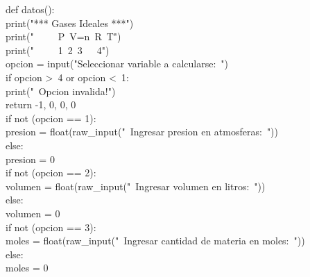 \documentclass[10pt,letterpaper]{article}
\newenvironment{Code}
{
\begin{lrbox}{\selvestebox}%
\begin{minipage}{\dimexpr\columnwidth-2\fboxsep\relax}
\fontfamily{\ttdefault}\selectfont
}
{\end{minipage}\end{lrbox}%
\begin{center}
\colorbox{light-gray}{\usebox{\selvestebox}}
\end{center}
}
\begin{document}
\begin{Code}
def datos():\\
\hspace*{8mm}print("*** Gases Ideales ***")\\
\hspace*{8mm}print("\ \ \ \ \ P\ V=n\ R\ T")\\
\hspace*{8mm}print("\ \ \ \ \ 1\ 2\ 3\ \ \ 4")\\
\hspace*{8mm}opcion = input("Seleccionar variable a calcularse:\ ")\\
\hspace*{8mm}if opcion >\ 4 or opcion <\ 1:\\
\hspace*{16mm}print("\ \hspace*{-2mm}Opcion invalida!")\\
\hspace*{16mm}return -1, 0, 0, 0\\
\hspace*{8mm}if not (opcion == 1):\\
\hspace*{16mm}presion = float(raw\_input("\ \hspace*{-2mm}Ingresar presion en atmosferas:\ "))\\
\hspace*{8mm}else:\\
\hspace*{16mm}presion = 0\\
\hspace*{8mm}if not (opcion == 2):\\
\hspace*{16mm}volumen = float(raw\_input("\ \hspace*{-2mm}Ingresar volumen en litros:\ "))\\
\hspace*{8mm}else:\\
\hspace*{16mm}volumen = 0\\
\hspace*{8mm}if not (opcion == 3):\\
\hspace*{16mm}moles = float(raw\_input("\ \hspace*{-2mm}Ingresar cantidad de materia en moles:\ "))\\
\hspace*{8mm}else:\\
\hspace*{16mm}moles = 0\\

\end{Code}
\end{document}
